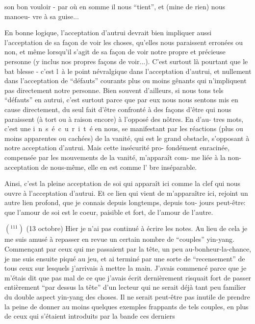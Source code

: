 son bon vouloir - par où en somme il nous ``tient'', et (mine de rien) nous manoeu-\linebreak
vre à sa guise...

En bonne logique, l'acceptation d'autrui devrait bien impliquer aussi
l'acceptation de sa façon de voir les choses, qu'elles nous paraissent erronées
ou non, et même lorsqu'il s'agit de sa façon de voir notre propre et précieuse
personne (y inclus nos propres façons de voir...). C'est surtout là pourtant que
le bat blesse - c'est \mbox{l à} le point névralgique dans l'acceptation d'autrui,
et nullement dans l'acceptation de ``défauts'' courants plus ou moins gênants qui
n'impliquent pas directement notre personne. Bien souvent d'ailleurs, si nous \linebreak
tons tels ``défauts'' en autrui, c'est surtout parce que par eux nous nous sentons
mis en cause directement, du seul fait d'être confronté à des façons d'être
qui nous paraissent (à tort ou à raison encore) à l'opposé des nôtres. En d'au-\linebreak
tres mots, c'est une \mbox{i n s é c u r i t é} en nous, se manifestant par les
réactions (plus ou moins apparentes ou cachées) de la vanité, qui est le grand
obstacle, s'opposant à notre acceptation d'autrui. Mais cette insécurité pro-\linebreak
fondément enracinée, compensée par les mouvements de la vanité, m'apparaît com-\linebreak
me  liée à la non-acceptation de nous-même, elle en est comme l'\linebreak
bre inséparable.

Ainsi, c'est la pleine acceptation de soi qui apparaît ici comme la clef
qui nous ouvre à l'acceptation d'autrui. Et ce lien qui vient de m'apparaître
ici, rejoint un autre lien profond, que je connais depuis longtemps, depuis tou-\linebreak
jours peut-être: que l'amour de soi est le coeur, paisible et fort, de l'amour
de l'autre.

\(({}^{111})\) (13 octobre) Hier je n'ai pas continué à écrire les notes. Au lieu de cela
je me suis amusé à repasser en revue un certain nombre de ``couples'' yin-yang.\unsure{\inserted{:}}
Commençant par ceux qui me passaient par la tête, un peu au-bonheur-la-chance,
je me suis ensuite piqué au jeu, et ai terminé par une sorte de ``recensement'' de
tous ceux sur lesquels j'arrivais à mettre la main. J'avais commencé parce que
je m'étais dit que pas mal de ce que j'avais écrit dernièrement risquait fort de
passer entièrement ``par dessus la tête'' d'un lecteur qui ne serait déjà tant 
peu familier du double aspect yin-yang des choses. Il ne serait peut-être pas
inutile de prendre la peine de donner au moins quelques exemples frappants de
tels couples, en plus de ceux qui s'étaient introduits par la bande ces derniers
\margin{\unsure{-}}
